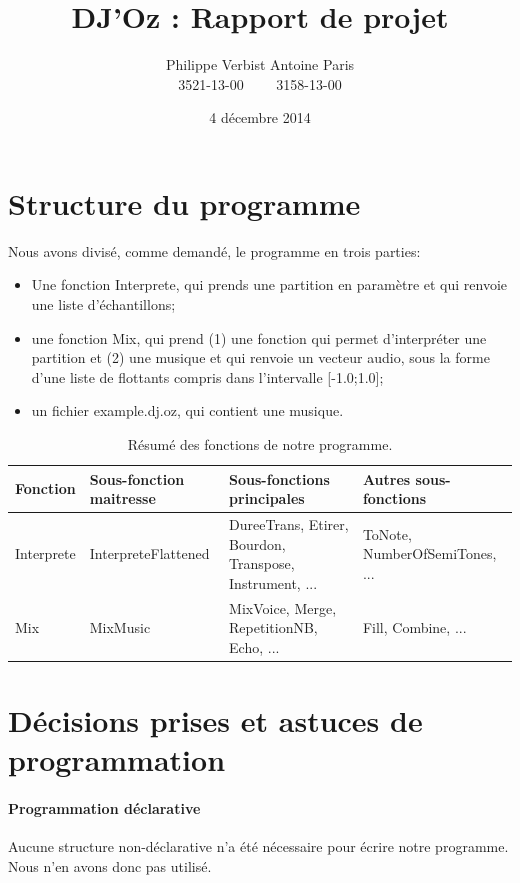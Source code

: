 \documentclass[10pt,a4paper]{article}
\author{Philippe Verbist  Antoine Paris\\3521-13-00 \ \ \ \ 3158-13-00}
\title{DJ'Oz : Rapport de projet}
\date{4 décembre 2014}
\begin{document}
\maketitle


\section{Structure du programme}
Nous avons divisé, comme demandé, le programme en trois parties:
\begin{itemize}
	\item Une fonction Interprete, qui prends une partition en 	paramètre et qui renvoie une liste d'échantillons;
	\item une fonction Mix, qui prend (1) une fonction qui permet d'interpréter une partition  et (2) une musique et qui renvoie un vecteur audio, sous la forme d'une liste de flottants compris dans l'intervalle [-1.0;1.0];
	\item un fichier example.dj.oz, qui contient une musique.
\end{itemize}



	\begin{table}[ht!]
		\centering
			\begin{tabular}{|p{}|p{}|p{0.25\textwidth}|p{}|}
			\hline
			\textbf{Fonction}		& \textbf{Sous-fonction maitresse}& \textbf{Sous-fonctions principales} & \textbf{Autres sous-fonctions}	\\
			\hline
Interprete		&InterpreteFlattened	& DureeTrans, Etirer, Bourdon, Transpose, Instrument, ... & ToNote, NumberOfSemiTones, ...\\
			\hline
Mix 	& MixMusic &  MixVoice, Merge, RepetitionNB, Echo, ... &  Fill, Combine, ...\\
			\hline 


			\hline
			\end{tabular}
		\caption{Résumé des fonctions de notre programme.}
	\end{table}


\section{Décisions prises et astuces de programmation}
\paragraph{Programmation déclarative} Aucune structure non-déclarative n'a été nécessaire pour écrire notre programme. Nous n'en avons donc pas utilisé.
\end{document}
